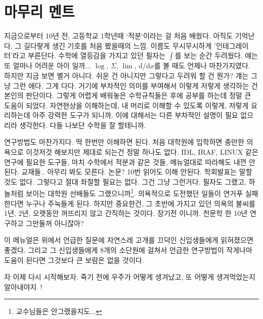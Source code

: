 \section{마무리 멘트}
지금으로부터 10년 전, 고등학교 1학년때 ‘적분‘이라는 걸 처음 배웠다. 아직도
기억난다. 그 길다랗게 생긴 기호를 처음 봤을때의 느낌. 이름도 무시무시하게
’인테그레이터’라고 부른단다. 수학에 열등감을 가지고 있던 필자는 $\int$를 보는
순간 두려웠다. 얘는 또 얼마나 어려운 아이 일까... $\log$, $\Sigma$, $\lim$,
$\mathrm{d}/\mathrm{d}x$를 볼 때도 언제나 마찬가지였다. 하지만 지금 보면 별거
아니다. 쉬운 건 아니지만 그렇다고 두려워 할 건 뭔가? 걔는 그냥 그런 애다. 그게
다다. 거기에 부차적인 의미를 부여해서 이렇게 저렇게 생각하는 건 본인의
판단이다. 그렇게 어렵게 배워놓은 수학규칙들은 후에 공부를 하는데 정말 큰 도움이
되었다. 자연현상을 이해하는데, 내 머리로 이해할 수 있도록 이렇게, 저렇게
요리하는데 아주 강력한 도구가 되니까. 이에 대해서는 다른 부차적인 설명이 필요
없으리라 생각한다. 다들 나보단 수학을 잘 할테니까.

연구방법도 마찬가지다. 딱 한번만 이해하면 된다. 처음 대학원에 입학하면 충만한
의욕으로 이것저것 해보지만 제대로 되는건 정말 하나도 없다. IDL, IRAF, LINUX 같은
연구에 필요한 도구들, 마치 수학에서 적분과 같은 것들, 메뉴얼대로 따라해도 내껀 안
된다. 교재들.. 아무리 봐도 모른다. 논문?  10번 읽어도 이해 안된다. 학회발표는
말할 것도 없다. 그렇다고 절대 좌절할 필요는 없다. 그건 그냥 그런거다. 필자도
그랬고, 하늘처럼 보이는 대학원 선배들도 그랬으니까\footnote{교수님들은
  안그랬을지도...}. 의욕적으로 도전했던 일들이 연거푸 실패한다면 누구나 주눅들게
된다. 하지만 중요한건, 그 초반에 가지고 있던 의욕의 불씨를 1년, 2년, 오랫동안
꺼뜨리지 않고 간직하는 것이다. 장기전 이니까. 천문학 한 10년 연구하고 그만둘꺼
아니잖아?

이 메뉴얼은 위에서 언급한 질문에 자연스레 고개를 끄덕인 신입생들에게 읽혀졌으면
좋겠다. 그리고 그 신입생들에게 8개의 소단원에 걸쳐서 언급한 연구방법이 작게나마
도움이 된다면 그것보다 큰 보람은 없을 것이다.

자 이제 다시 시작해보자. 죽기 전에 우주가 어떻게 생겨났고, 또 어떻게 생겨먹었는지
알아내야지~!


